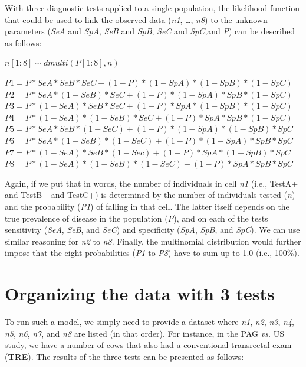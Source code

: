 \documentclass[
]{book}
\begin{document}
With three diagnostic tests applied to a single population, the likelihood function that could be used to link the observed data (\emph{n1}, \ldots, \emph{n8}) to the unknown parameters (\emph{SeA} and \emph{SpA}, \emph{SeB} and \emph{SpB}, \emph{SeC} and \emph{SpC},and \emph{P}) can be described as follows:

\(n[1:8] \sim dmulti(P[1:8], n)\)

\(P1 = P*SeA*SeB*SeC + (1-P)*(1-SpA)*(1-SpB)*(1-SpC)\)\\
\(P2 = P*SeA*(1-SeB)*SeC + (1-P)*(1-SpA)*SpB*(1-SpC)\)\\
\(P3 = P*(1-SeA)*SeB*SeC + (1-P)*SpA*(1-SpB)*(1-SpC)\)\\
\(P4 = P*(1-SeA)*(1-SeB)*SeC + (1-P)*SpA*SpB*(1-SpC)\)\\
\(P5 = P*SeA*SeB*(1-SeC) + (1-P)*(1-SpA)*(1-SpB)*SpC\)\\
\(P6 = P*SeA*(1-SeB)*(1-SeC) + (1-P)*(1-SpA)*SpB*SpC\)\\
\(P7 = P*(1-SeA)*SeB*(1-Sec) + (1-P)*SpA*(1-SpB)*SpC\)\\
\(P8 = P*(1-SeA)*(1-SeB)*(1-SeC) + (1-P)*SpA*SpB*SpC\)

Again, if we put that in words, the number of individuals in cell \emph{n1} (i.e., TestA+ and TestB+ and TestC+) is determined by the number of individuals tested (\emph{n}) and the probability (\emph{P1}) of falling in that cell. The latter itself depends on the true prevalence of disease in the population (\emph{P}), and on each of the tests sensitivity (\emph{SeA}, \emph{SeB}, and \emph{SeC}) and specificity (\emph{SpA}, \emph{SpB}, and \emph{SpC}). We can use similar reasoning for \emph{n2} to \emph{n8}. Finally, the multinomial distribution would further impose that the eight probabilities (\emph{P1} to \emph{P8}) have to sum up to 1.0 (i.e., 100\%).

\section{Organizing the data with 3 tests}\label{organizing-the-data-with-3-tests}

To run such a model, we simply need to provide a dataset where \emph{n1}, \emph{n2}, \emph{n3}, \emph{n4}, \emph{n5}, \emph{n6}, \emph{n7}, and \emph{n8} are listed (in that order). For instance, in the PAG \emph{vs.} US study, we have a number of cows that also had a conventional transrectal exam (\textbf{TRE}). The results of the three tests can be presented as follows:
\end{document}
